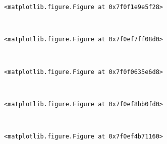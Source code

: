 \documentclass[11pt]{article}
\begin{document}
    
    \begin{verbatim}
<matplotlib.figure.Figure at 0x7f0f1e9e5f28>
    \end{verbatim}

    
    \begin{center}
    \end{center}
    { \hspace*{\fill} \\}
    
    
    \begin{verbatim}
<matplotlib.figure.Figure at 0x7f0ef7ff08d0>
    \end{verbatim}

    
    \begin{center}
    \end{center}
    { \hspace*{\fill} \\}
    
    
    \begin{verbatim}
<matplotlib.figure.Figure at 0x7f0f0635e6d8>
    \end{verbatim}

    
    \begin{center}
    \end{center}
    { \hspace*{\fill} \\}
    
    
    \begin{verbatim}
<matplotlib.figure.Figure at 0x7f0ef8bb0fd0>
    \end{verbatim}

    
    \begin{center}
    \end{center}
    { \hspace*{\fill} \\}
    
    
    \begin{verbatim}
<matplotlib.figure.Figure at 0x7f0ef4b71160>
    \end{verbatim}

    
    \begin{center}
    \end{center}
    { \hspace*{\fill} \\}
    
\end{document}
